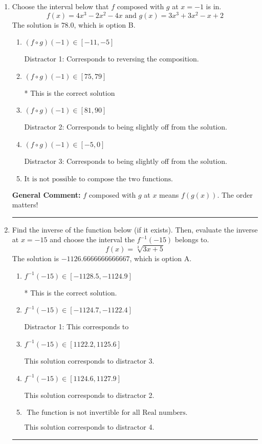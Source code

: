 \documentclass{extbook}[14pt]
\newcommand{\litem}[1]{\item #1

\rule{\textwidth}{0.4pt}}
\begin{document}
\begin{enumerate}\litem{
Choose the interval below that $f$ composed with $g$ at $x=-1$ is in.
\[ f(x) = 4x^{3} -2 x^{2} -4 x \text{ and } g(x) = 3x^{3} +3 x^{2} -x + 2 \]The solution is \( 78.0 \), which is option B.\begin{enumerate}[label=\Alph*.]
\item \( (f \circ g)(-1) \in [-11, -5] \)

 Distractor 1: Corresponds to reversing the composition.
\item \( (f \circ g)(-1) \in [75, 79] \)

* This is the correct solution
\item \( (f \circ g)(-1) \in [81, 90] \)

 Distractor 2: Corresponds to being slightly off from the solution.
\item \( (f \circ g)(-1) \in [-5, 0] \)

 Distractor 3: Corresponds to being slightly off from the solution.
\item \( \text{It is not possible to compose the two functions.} \)


\end{enumerate}

\textbf{General Comment:} $f$ composed with $g$ at $x$ means $f(g(x))$. The order matters!
}
\litem{
Find the inverse of the function below (if it exists). Then, evaluate the inverse at $x = -15$ and choose the interval the $f^{-1}(-15)$ belongs to.
\[ f(x) = \sqrt[3]{3 x + 5} \]The solution is \( -1126.6666666666667 \), which is option A.\begin{enumerate}[label=\Alph*.]
\item \( f^{-1}(-15) \in [-1128.5, -1124.9] \)

* This is the correct solution.
\item \( f^{-1}(-15) \in [-1124.7, -1122.4] \)

 Distractor 1: This corresponds to 
\item \( f^{-1}(-15) \in [1122.2, 1125.6] \)

 This solution corresponds to distractor 3.
\item \( f^{-1}(-15) \in [1124.6, 1127.9] \)

 This solution corresponds to distractor 2.
\item \( \text{ The function is not invertible for all Real numbers. } \)

 This solution corresponds to distractor 4.
\end{enumerate}

}
\end{enumerate}
\end{document}
